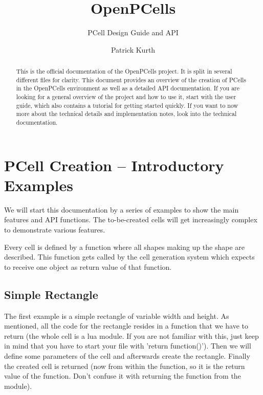 

\title{OpenPCells}
\subtitle{PCell Design Guide and API}
\author{Patrick Kurth}


\maketitle
\begin{abstract}
    \noindent This is the official documentation of the OpenPCells project.  It is split in several different files for clarity. This document provides an overview
    of the creation of PCells in the OpenPCells environment as well as a detailed API documentation.  If you are looking for a general overview of the project and
    how to use it, start with the user guide, which also contains a tutorial for getting started quickly. If you want to now more about the technical details and
    implementation notes, look into the technical documentation.
\end{abstract}

\tableofcontents

\section{PCell Creation -- Introductory Examples}
We will start this documentation by a series of examples to show the main features and API functions. The to-be-created cells will get increasingly complex to
demonstrate various features.

Every cell is defined by a function where all shapes making up the shape are described. This function gets called by the cell generation system which expects to
receive one object as return value of that function.

\subsection{Simple Rectangle}
The first example is a simple rectangle of variable width and height. As mentioned, all the code for the rectangle resides in a function that we have to return (the
whole cell is a lua module. If you are not familiar with this, just keep in mind that you have to start your file with 'return function()'). Then we will define some
parameters of the cell and afterwards create the rectangle. Finally the created cell is returned (now from within the function, so it is the return value of the
function. Don't confuse it with returning the function from the module).

